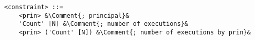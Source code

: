 \lstset{mathescape, language=AST, escapechar=\&}  
\begin{minipage}[c]{0.95\textwidth}
\begin{lstlisting}[frame=single, caption={constraint},label={lst:constraintast}]
<constraint> ::=  
	<prin> &\Comment{; principal}&
	'Count' [N] &\Comment{; number of executions}&
	<prin> ('Count' [N]) &\Comment{; number of executions by prin}&
\end{lstlisting}
\end{minipage}